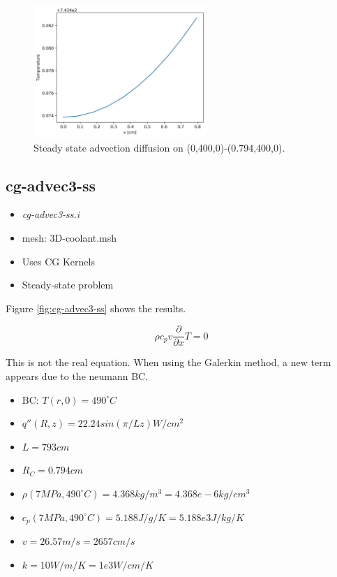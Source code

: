 \documentclass[11pt,letterpaper]{article}
\begin{document}
	\begin{figure}[htbp!]
		\centering
		\includegraphics[height=5cm]{cg-advec2-ssC}
		\caption{Steady state advection diffusion on (0,400,0)-(0.794,400,0).}
		\label{fig:cg-advec2-ssB}
	\end{figure}

	\subsection{cg-advec3-ss}

	\begin{itemize}
		\item \textit{cg-advec3-ss.i}
		\item mesh: 3D-coolant.msh
		\item Uses CG Kernels
		\item Steady-state problem
	\end{itemize}

    Figure \ref{fig:cg-advec3-ss} shows the results.

	\begin{equation}
    \rho c_p v \frac{\partial}{\partial x} T = 0
	\end{equation}

	This is not the real equation. When using the Galerkin method, a new term appears due to the neumann BC.

	\begin{itemize}
		\item BC: $T(r, 0) = 490^{\circ}C$
		\item $q''(R, z) = 22.24 sin (\pi/L z) W/cm^2$
		\item $L = 793 cm$
		\item $R_C = 0.794 cm$
		\item $\rho (7 MPa, 490^{\circ}C) = 4.368 kg/m^3 = 4.368e-6 kg/cm^3$
		\item $c_p (7 MPa, 490^{\circ}C) = 5.188 J/g/K = 5.188e3 J/kg/K$
		\item $v = 26.57 m/s = 2657 cm/s$
		\item $k = 10 W/m/K = 1e3 W/cm/K$
	\end{itemize}
\end{document}
